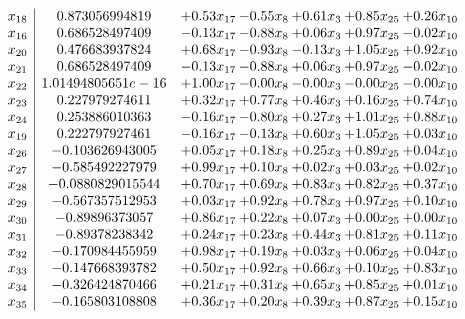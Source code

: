 \documentclass[8pt]{article}
\begin{document}
\[\begin{array}{c| c c@{\hskip 2pt} c@{\hskip 2pt} c@{\hskip 2pt} c@{\hskip 2pt} c@{\hskip 2pt} }
 x_{18}   &  0.873056994819 & +  0.53 x_{17} & -0.55 x_{8} & +  0.61 x_{3} & +  0.85 x_{25} & +  0.26 x_{10}\\
 x_{16}   &  0.686528497409 & -0.13 x_{17} & -0.88 x_{8} & +  0.06 x_{3} & +  0.97 x_{25} & -0.02 x_{10}\\
 x_{20}   &  0.476683937824 & +  0.68 x_{17} & -0.93 x_{8} & -0.13 x_{3} & +  1.05 x_{25} & +  0.92 x_{10}\\
 x_{21}   &  0.686528497409 & -0.13 x_{17} & -0.88 x_{8} & +  0.06 x_{3} & +  0.97 x_{25} & -0.02 x_{10}\\
 x_{22}   &  1.01494805651e-16 & +  1.00 x_{17} & -0.00 x_{8} & -0.00 x_{3} & -0.00 x_{25} & -0.00 x_{10}\\
 x_{23}   &  0.227979274611 & +  0.32 x_{17} & +  0.77 x_{8} & +  0.46 x_{3} & +  0.16 x_{25} & +  0.74 x_{10}\\
 x_{24}   &  0.253886010363 & -0.16 x_{17} & -0.80 x_{8} & +  0.27 x_{3} & +  1.01 x_{25} & +  0.88 x_{10}\\
 x_{19}   &  0.222797927461 & -0.16 x_{17} & -0.13 x_{8} & +  0.60 x_{3} & +  1.05 x_{25} & +  0.03 x_{10}\\
 x_{26}   &  -0.103626943005 & +  0.05 x_{17} & +  0.18 x_{8} & +  0.25 x_{3} & +  0.89 x_{25} & +  0.04 x_{10}\\
 x_{27}   &  -0.585492227979 & +  0.99 x_{17} & +  0.10 x_{8} & +  0.02 x_{3} & +  0.03 x_{25} & +  0.02 x_{10}\\
 x_{28}   &  -0.0880829015544 & +  0.70 x_{17} & +  0.69 x_{8} & +  0.83 x_{3} & +  0.82 x_{25} & +  0.37 x_{10}\\
 x_{29}   &  -0.567357512953 & +  0.03 x_{17} & +  0.92 x_{8} & +  0.78 x_{3} & +  0.97 x_{25} & +  0.10 x_{10}\\
 x_{30}   &  -0.89896373057 & +  0.86 x_{17} & +  0.22 x_{8} & +  0.07 x_{3} & +  0.00 x_{25} & +  0.00 x_{10}\\
 x_{31}   &  -0.89378238342 & +  0.24 x_{17} & +  0.23 x_{8} & +  0.44 x_{3} & +  0.81 x_{25} & +  0.11 x_{10}\\
 x_{32}   &  -0.170984455959 & +  0.98 x_{17} & +  0.19 x_{8} & +  0.03 x_{3} & +  0.06 x_{25} & +  0.04 x_{10}\\
 x_{33}   &  -0.147668393782 & +  0.50 x_{17} & +  0.92 x_{8} & +  0.66 x_{3} & +  0.10 x_{25} & +  0.83 x_{10}\\
 x_{34}   &  -0.326424870466 & +  0.21 x_{17} & +  0.31 x_{8} & +  0.65 x_{3} & +  0.85 x_{25} & +  0.01 x_{10}\\
 x_{35}   &  -0.165803108808 & +  0.36 x_{17} & +  0.20 x_{8} & +  0.39 x_{3} & +  0.87 x_{25} & +  0.15 x_{10}\\

\end{array}\]
\end{document}
